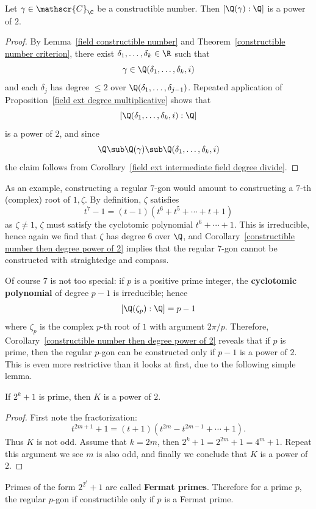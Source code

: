 \begin{corollary}\label{constructible number then degree power of 2}
Let $\gamma\in\mathscr{C}_{\C}$ be a constructible number. Then $[\Q(\gamma):\Q]$ is a power of $2$.
\end{corollary}
\begin{proof}
By Lemma~\ref{field constructible number} and Theorem~\ref{constructible number criterion}, there exist $\delta_1,\dots,\delta_k\in\R$ such that
\[\gamma\in\Q(\delta_1,\dots,\delta_k,i)\]
and each $\delta_j$ has degree $\leq 2$ over $\Q(\delta_1,\dots,\delta_{j-1})$. Repeated application of Proposition~\ref{field ext degree multiplicative} shows that
\[[\Q(\delta_1,\dots,\delta_k,i):\Q]\]
is a power of $2$, and since
\[\Q\sub\Q(\gamma)\sub\Q(\delta_1,\dots,\delta_k,i)\]
the claim follows from Corollary~\ref{field ext intermediate field degree divide}.
\end{proof}
As an example, constructing a regular $7$-gon would amount to constructing a $7$-th (complex) root of $1,\zeta$. By definition, $\zeta$ satisfies
\[t^7-1=(t-1)(t^6+t^5+\cdots+t+1)\]
as $\zeta\neq 1$, $\zeta$ must satisfy the cyclotomic polynomial $t^6+\cdots+1$. This is irreducible, hence again we find that $\zeta$ has degree $6$ over $\Q$, and Corollary~\ref{constructible number then degree power of 2} implies that the regular $7$-gon cannot be constructed with straightedge and compass.\par
Of course $7$ is not too special: if $p$ is a positive prime integer, the \textbf{cyclotomic polynomial} of degree $p-1$ is irreducible; hence
\[[\Q(\zeta_p):\Q]=p-1\]
where $\zeta_p$ is the complex $p$-th root of $1$ with argument $2\pi/p$. Therefore, Corollary~\ref{constructible number then degree power of 2} reveals that if $p$ is prime, then the regular $p$-gon can be constructed only if $p-1$ is a power of $2$. This is even more restrictive than it looks at first, due to the following simple lemma.
\begin{lemma}
If $2^k+1$ is prime, then $K$ is a power of $2$.
\end{lemma}
\begin{proof}
First note the fractorization:
\[t^{2m+1}+1=(t+1)(t^{2m}-t^{2m-1}+\cdots+1).\]
Thus $K$ is not odd. Assume that $k=2m$, then $2^k+1=2^{2m}+1=4^m+1$. Repeat this argument we see $m$ is also odd, and finally we conclude that $K$ is a power of $2$.
\end{proof}
Primes of the form $2^{2^\ell}+1$ are called \textbf{Fermat primes}. Therefore for a prime $p$, the regular $p$-gon if constructible only if $p$ is a Fermat prime.\par
